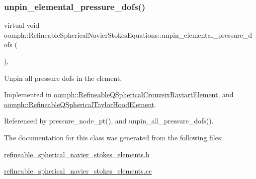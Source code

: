 \mbox{\label{classoomph_1_1RefineableSphericalNavierStokesEquations_a6d4b7f91dc9139367408a3b9f067920d}} 
\subsubsection{\texorpdfstring{unpin\+\_\+elemental\+\_\+pressure\+\_\+dofs()}{unpin\_elemental\_pressure\_dofs()}}
{\footnotesize\ttfamily virtual void oomph\+::\+Refineable\+Spherical\+Navier\+Stokes\+Equations\+::unpin\+\_\+elemental\+\_\+pressure\+\_\+dofs (\begin{DoxyParamCaption}{ }\end{DoxyParamCaption})\hspace{0.3cm}{\ttfamily [protected]}, {}}



Unpin all pressure dofs in the element. 



Implemented in \hyperlink{classoomph_1_1RefineableQSphericalCrouzeixRaviartElement_a6812b8e6bb7bbe56c75e60296512baa7}{oomph\+::\+Refineable\+Q\+Spherical\+Crouzeix\+Raviart\+Element}, and \hyperlink{classoomph_1_1RefineableQSphericalTaylorHoodElement_af90c9272d1d4ba4983141effe918d135}{oomph\+::\+Refineable\+Q\+Spherical\+Taylor\+Hood\+Element}.



Referenced by pressure\+\_\+node\+\_\+pt(), and unpin\+\_\+all\+\_\+pressure\+\_\+dofs().



The documentation for this class was generated from the following files\+:\begin{DoxyCompactItemize}
\item 
\hyperlink{refineable__spherical__navier__stokes__elements_8h}{refineable\+\_\+spherical\+\_\+navier\+\_\+stokes\+\_\+elements.\+h}\item 
\hyperlink{refineable__spherical__navier__stokes__elements_8cc}{refineable\+\_\+spherical\+\_\+navier\+\_\+stokes\+\_\+elements.\+cc}\end{DoxyCompactItemize}
